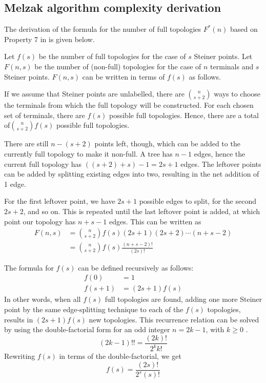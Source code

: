 \documentclass{l4proj}
\begin{document}
\begin{appendices}

    \chapter{Melzak algorithm complexity derivation}
    \label{app:melzak_complexity}
    The derivation of the formula for the number of full topologies $F^*(n)$ based on Property 7 in \cite{Gilbert1968SteinerMT} is given below.

    Let $f(s)$ be the number of full topologies for the case of $s$ Steiner points.
    Let $F(n, s)$ be the number of (non-full) topologies for the case of $n$ terminals and $s$ Steiner points. $F(n, s)$ can be written in terms of $f(s)$ as follows.

    If we assume that Steiner points are unlabelled, there are $\binom{n}{s+2}$ ways to choose the terminals from which the full topology will be constructed. For each chosen set of terminals, there are $f(s)$ possible full topologies. Hence, there are a total of$\binom{n}{s+2}f(s)$ possible full topologies.

    There are still $n - (s + 2)$ points left, though, which can be added to the currently full topology to make it non-full. A tree has $n - 1$ edges, hence the current full topology has $((s + 2) + s) - 1 = 2s + 1$ edges. The leftover points can be added by splitting existing edges into two, resulting in the net addition of 1 edge.

    For the first leftover point, we have $2s + 1$ possible edges to split, for the second $2s + 2$, and so on. This is repeated until the last leftover point is added, at which point our topology has $n + s - 1$ edges. This can be written as
    \begin{equation*}
        \begin{aligned}
            F(n, s) & = \binom{n}{s+2}f(s)(2s + 1)(2s + 2)\cdots(n + s - 2) \\
                    & = \binom{n}{s+2}f(s)\frac{(n + s - 2)!}{(2s)!}
        \end{aligned}
    \end{equation*}

    The formula for $f(s)$ can be defined recursively as follows:
    \begin{equation*}
        \begin{aligned}
            f(0)   & = 1            \\
            f(s+1) & = (2s + 1)f(s)
        \end{aligned}
    \end{equation*}
    In other words, when all $f(s)$ full topologies are found, adding one more Steiner point by the same edge-splitting technique to each of the $f(s)$ topologies, results in $(2s + 1)f(s)$ new topologies.
    This recurrence relation can be solved by using the double-factorial form for an odd integer $n = 2k - 1$, with $k \ge 0$ \citep{Double_factorial}.
    $$
        (2k - 1)!! = \frac{(2k)!}{2^k k!}
    $$
    Rewriting $f(s)$ in terms of the double-factorial, we get
    $$
        f(s) = \frac{(2s)!}{2^{s}(s)!}
    $$


\end{appendices}
\end{document}
